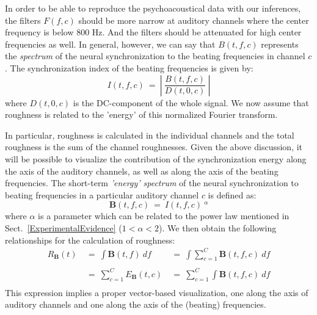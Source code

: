 In order to be able to reproduce the psychoacoustical data with
our inferences, the filters $F(f,c)$ should be more narrow at
auditory channels where the center frequency is below 800 Hz. And
the filters should be attenuated for high center frequencies as
well. In general, however, we can say that $B(t,f,c)$ represents
the \emph{spectrum} of the neural synchronization to the beating
frequencies in channel $c$. The synchronization index of the
beating frequencies is given by:
\begin{equation}
  I(t,f,c) ~=~ \left |~ \frac{B(t,f,c)}{D(t,0,c)}~\right |
\end{equation}
where $D(t,0,c)$ is the DC-component of the whole signal. We now
assume that roughness is related to the 'energy' of this
normalized Fourier transform.

In particular, roughness is calculated in the individual channels
and the total roughness is the sum of the channel roughnesses.
Given the above discussion, it will be possible to visualize the
contribution of the synchronization energy along the axis of the
auditory channels, as well as along the axis of the beating
frequencies. The short-term \emph{'energy' spectrum} of the neural
synchronization to beating frequencies in a particular auditory
channel $c$ is defined as:
\begin{equation}\label{Rspectrum}
\textbf{B}(t,f,c) ~=~ I(t,f,c) ~^\alpha
\end{equation}
where $\alpha$ is a parameter which can be related to the power
law mentioned in Sect.~\ref{ExperimentalEvidence} ($1<\alpha <2$).
We then obtain the following relationships for the calculation of
roughness:
\begin{equation}\label{R5}
\begin{array}{lll}
  R_\textbf{B}(t)&~=~\int \textbf{B}(t,f)~df
                 &~=~\int \sum_{c=1}^{C}
                 \textbf{B}(t,f,c)~df\\\\
                 &~=~\sum_{c=1}^{C} E_\textbf{B}(t,c)
                 &~=~\sum_{c=1}^{C} \int  \textbf{B}(t,f,c)~df\\
\end{array}
\end{equation}
This expression implies a proper vector-based visualization, one
along the axis of auditory channels and one along the axis of the
(beating) frequencies.

